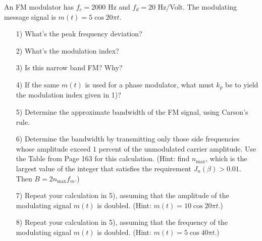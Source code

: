 \documentclass{assignment}
\begin{document}
\begin{prob}
    An FM modulator has $f_c=2000$ Hz and $f_d=20$ Hz/Volt. The modulating message signal is $m(t)=5\cos 20\pi t$.
    \begin{itemize}
        \item[1)] What's the peak frequency deviation?
        \item[2)] What's the modulation index?
        \item[3)] Is this narrow band FM? Why?
        \item[4)] If the same $m(t)$ is used for a phase modulator, what must $k_p$ be to yield the modulation index given in 1)?
        \item[5)] Determine the approximate bandwidth of the FM signal, using Carson's rule.
        \item[6)] Determine the bandwidth by transmitting only those side frequencies whose amplitude exceed $1$ percent of the unmodulated carrier amplitude. Use the Table from Page 163 for this calculation. (Hint: find $n_{\max}$, which is the largest value of the integer that satisfies the requirement $J_n(\beta)>0.01$. Then $B=2n_{\max}f_m$.)
        \item[7)] Repeat your calculation in 5), assuming that the amplitude of the modulating signal $m(t)$ is doubled. (Hint: $m(t)=10\cos 20\pi t$.)
        \item[8)] Repeat your calculation in 5), assuming that the frequency of the modulating signal $m(t)$ is doubled. (Hint: $m(t)=5\cos 40\pi t$.)
    \end{itemize}
\end{prob}
\end{document}
